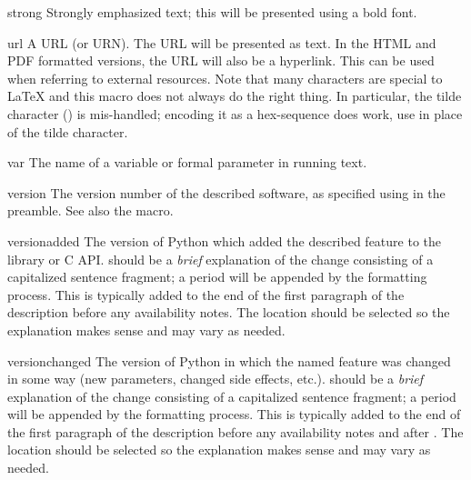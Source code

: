\documentclass{howto}
\begin{document}
    \begin{macrodesc}{strong}{}
      Strongly emphasized text; this will be presented using a bold
      font.
    \end{macrodesc}

    \begin{macrodesc}{url}{}
      A URL (or URN).  The URL will be presented as text.  In the HTML 
      and PDF formatted versions, the URL will also be a hyperlink.
      This can be used when referring to external resources.  Note
      that many characters are special to \LaTeX{} and this macro
      does not always do the right thing.  In particular, the tilde
      character (\character{\~}) is mis-handled; encoding it as a
      hex-sequence does work, use  in place of the tilde
      character.
    \end{macrodesc}

    \begin{macrodesc}{var}{}
      The name of a variable or formal parameter in running text.
    \end{macrodesc}

    \begin{macrodesc}{version}{}
      The version number of the described software, as specified using
       in the preamble.  See also the
       macro.
    \end{macrodesc}

    \begin{macrodesc}{versionadded}{}
      The version of Python which added the described feature to the
      library or C API.   should be a \emph{brief}
      explanation of the change consisting of a capitalized sentence
      fragment; a period will be appended by the formatting process.
      This is typically added to the end of the first paragraph of the
      description before any availability notes.  The location should
      be selected so the explanation makes sense and may vary as
      needed.
    \end{macrodesc}

    \begin{macrodesc}{versionchanged}{}
      The version of Python in which the named feature was changed in
      some way (new parameters, changed side effects, etc.).
       should be a \emph{brief} explanation of the
      change consisting of a capitalized sentence fragment; a
      period will be appended by the formatting process.
      This is typically added to the end of the first paragraph of the
      description before any availability notes and after
      .  The location should be selected so the
      explanation makes sense and may vary as needed.
    \end{macrodesc}
\end{document}
